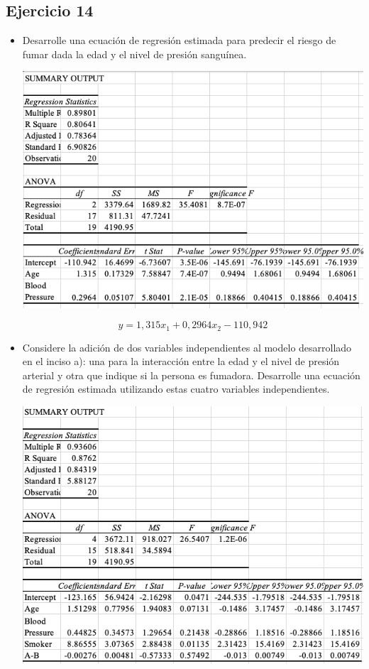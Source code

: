 \documentclass[a4paper,12pt]{article}
\begin{document}
\subsection{Ejercicio 14}
\begin{itemize}
    \item  Desarrolle una ecuación de regresión estimada para predecir el riesgo de fumar dada la edad y el nivel de presión sanguínea.
    \begin{center}
        \includegraphics[scale=0.5]{Imagenes/60-14.png}
    \end{center}
    $$y=1,315x_1+0,2964x_2-110,942$$
    \item  Considere la adición de dos variables independientes al modelo desarrollado en el inciso a): una para la interacción entre la edad y el nivel de presión arterial y otra que indique si la persona es fumadora. Desarrolle una ecuación de regresión estimada utilizando estas cuatro variables independientes.
    \begin{center}
        \includegraphics[scale=0.5]{Imagenes/60-27.png}

\end{center}
\end{itemize}
\end{document}
